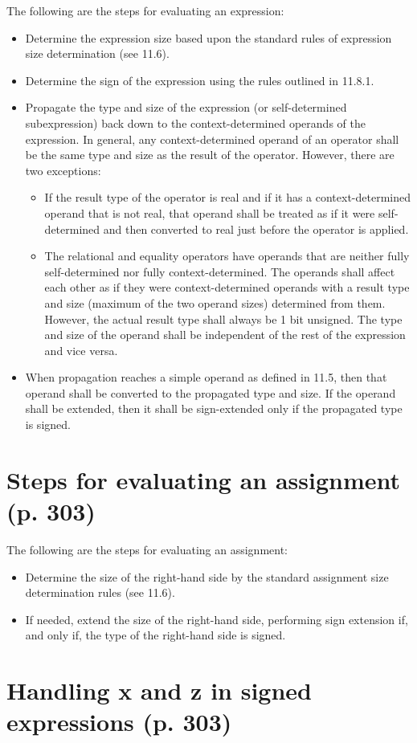 \documentclass{article}
\begin{document}
  {
    \color{red}

    The following are the steps for evaluating an expression:
    \begin{itemize}
      \item Determine the expression size based upon the standard rules of
        expression size determination (see 11.6).
      \item Determine the sign of the expression using the rules outlined in
        11.8.1.
      \item Propagate the type and size of the expression (or self-determined
        subexpression) back down to the context-determined operands of the
        expression. In general, any context-determined operand of an operator
        shall be the same type and size as the result of the operator.
        However, there are two exceptions:
        \begin{itemize}
          \item If the result type of the operator is real and if it has a
            context-determined operand that is not real, that operand
            shall be treated as if it were self-determined and then
            converted to real just before the operator is applied.
          \item The relational and equality operators have operands that are
            neither fully self-determined nor fully context-determined. The
            operands shall affect each other as if they were context-determined
            operands with a result type and size (maximum of the two operand
            sizes) determined from them. However, the actual result type shall
            always be 1 bit unsigned. The type and size of the operand shall be
            independent of the rest of the expression and vice versa.
        \end{itemize}
      \item When propagation reaches a simple operand as defined in 11.5, then
        that operand shall be converted to the propagated type and size. If the
        operand shall be extended, then it shall be sign-extended only if the
        propagated type is signed.
    \end{itemize}

    \section{Steps for evaluating an assignment (p. 303)}

    The following are the steps for evaluating an assignment:
    \begin{itemize}
      \item Determine the size of the right-hand side by the standard assignment
        size determination rules (see 11.6).
      \item If needed, extend the size of the right-hand side, performing sign
        extension if, and only if, the type of the right-hand side is signed.
    \end{itemize}
  }

\section{Handling x and z in signed expressions (p. 303)}

\textelp{}
\end{document}
